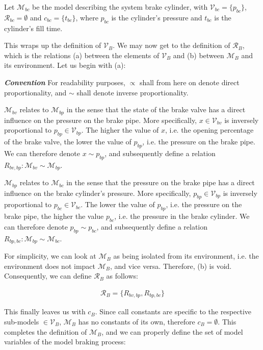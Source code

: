 \noindent
Let ${\mathcal {M}}_{bc}$ be the model describing the system brake cylinder, with ${\mathcal {V}}_{bc} = \{ p_{bc} \}$, ${\mathcal {R}}_{bc} = \emptyset$ and $c_{bc} = \{ t_{bc} \}$, where $p_{bc}$ is the cylinder's pressure and $t_{bc}$ is the cylinder's fill time.
\bigskip
\par\noindent
This wraps up the definition of ${\mathcal{V}}_{B}$. We may now get to the definition of ${\mathcal{R}}_{B}$, which is the relations (a) between the elements of ${\mathcal{V}}_{B}$ and (b) between ${\mathcal{M}}_{B}$ and its environment. Let us begin with (a):
\bigskip
\par\noindent
\textit{\textbf{Convention}} For readability purposes, $\propto$ shall from here on denote direct proportionality, and $\sim$ shall denote inverse proportionality.
\bigskip
\par
${\mathcal{M}}_{bv}$ relates to ${\mathcal{M}}_{bp}$ in the sense that the state of the brake valve has a direct influence on the pressure on the brake pipe. More specifically, $x \in {\mathcal{V}}_{bv}$ is inversely proportional to $p_{bp} \in {\mathcal{V}}_{bp}$. The higher the value of $x$, i.e. the opening percentage of the brake valve, the lower the value of $p_{bp}$, i.e. the pressure on the brake pipe. We can therefore denote $x \sim p_{bp}$, and subsequently define a relation $R_{bv,bp}: {\mathcal{M}}_{bv} \sim {\mathcal{M}}_{bp}$. 
\par
${\mathcal{M}}_{bp}$ relates to ${\mathcal{M}}_{bc}$ in the sense that the pressure on the brake pipe has a direct influence on the brake cylinder's pressure. More specifically, $p_{bp} \in {\mathcal{V}}_{bp}$ is inversely proportional to $p_{bc} \in {\mathcal{V}}_{bc}$. The lower the value of $p_{bp}$, i.e. the pressure on the brake pipe, the higher the value $p_{bc}$, i.e. the pressure in the brake cylinder. We can therefore denote $p_{bp} \sim p_{bc}$, and subsequently define a relation $R_{bp,bc}: {\mathcal{M}}_{bp} \sim {\mathcal{M}}_{bc}$.
\par
For simplicity, we can look at ${\mathcal{M}}_{B}$ as being isolated from its environment, i.e. the environment does not impact ${\mathcal{M}}_{B}$, and vice versa. Therefore, (b) is void. Consequently, we can define ${\mathcal{R}}_{B}$ as follows:

\begin{align*}
{\mathcal{R}}_{B} = \{ R_{bv,bp}, R_{bp,bc} \}
\end{align*}

\noindent
This finally leaves us with $c_{B}$. Since call constants are specific to the respective sub-models $\in {\mathcal{V}}_{B}$, ${\mathcal{M}}_{B}$ has no constants of its own, therefore $c_{B} = \emptyset$. This completes the definition of ${\mathcal{M}}_{B}$, and we can properly define the set of model variables of the model braking process:

